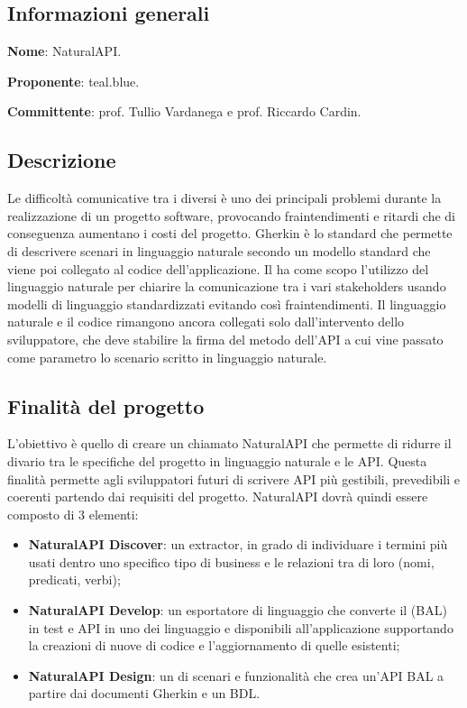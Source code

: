 \documentclass[../studio-di-fattibilita.tex]{subfiles}
\begin{document}
\subsection{Informazioni generali}%
\label{sub:informazioni_generale}
\begin{description}
  \item \textbf{Nome}: NaturalAPI.
  \item \textbf{Proponente}: teal.blue.
  \item \textbf{Committente}: prof. Tullio Vardanega e prof. Riccardo Cardin.
\end{description}

\subsection{Descrizione}%
\label{descrizione}
Le difficoltà comunicative tra i diversi  è uno dei principali problemi durante la realizzazione di un progetto software, provocando fraintendimenti e ritardi che di conseguenza aumentano i costi del progetto. Gherkin è lo standard che permette di descrivere scenari in linguaggio naturale secondo un modello standard che viene poi collegato al codice dell'applicazione. Il  ha come scopo l'utilizzo del linguaggio naturale per chiarire la comunicazione tra i vari stakeholders usando modelli di linguaggio standardizzati evitando così fraintendimenti. Il linguaggio naturale e il codice rimangono ancora collegati solo dall'intervento dello sviluppatore, che deve stabilire la firma del metodo dell'API a cui vine passato come parametro lo scenario scritto in linguaggio naturale.
\subsection{Finalità del progetto}%
\label{finalita_del_progetto}
L'obiettivo è quello di creare un   chiamato NaturalAPI che permette di ridurre il divario tra le specifiche del progetto in linguaggio naturale e le API. Questa finalità permette agli sviluppatori futuri di scrivere API più gestibili, prevedibili e coerenti partendo dai requisiti del progetto. NaturalAPI dovrà quindi essere composto di 3 elementi:
\begin{itemize}
  \item \textbf{NaturalAPI Discover}: un  extractor, in grado di individuare i termini più usati dentro uno specifico tipo di business e le relazioni tra di loro (nomi, predicati, verbi);
  \item \textbf{NaturalAPI Develop}: un esportatore di linguaggio che converte il  (BAL) in test e API in uno dei linguaggio e  disponibili all'applicazione supportando la creazioni di nuove  di codice e l'aggiornamento di quelle esistenti;
  \item \textbf{NaturalAPI Design}: un  di scenari e funzionalità che crea un'API BAL a partire dai documenti Gherkin e un BDL.
\end{itemize}
\end{document}

